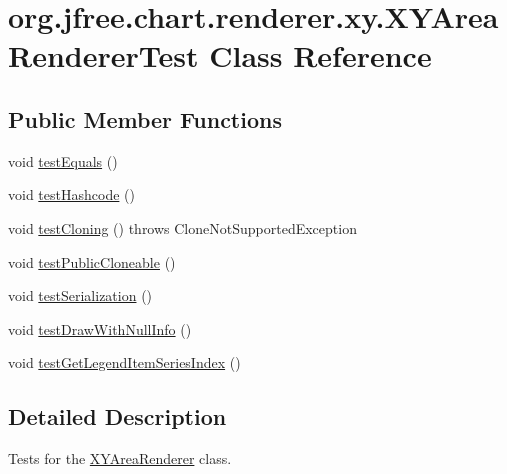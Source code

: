 \hypertarget{classorg_1_1jfree_1_1chart_1_1renderer_1_1xy_1_1_x_y_area_renderer_test}{}\section{org.\+jfree.\+chart.\+renderer.\+xy.\+X\+Y\+Area\+Renderer\+Test Class Reference}
\label{classorg_1_1jfree_1_1chart_1_1renderer_1_1xy_1_1_x_y_area_renderer_test}
\subsection*{Public Member Functions}
\begin{DoxyCompactItemize}
\item 
void \mbox{\hyperlink{classorg_1_1jfree_1_1chart_1_1renderer_1_1xy_1_1_x_y_area_renderer_test_ac270cd68baeffc1e280adbdd4898404e}{test\+Equals}} ()
\item 
void \mbox{\hyperlink{classorg_1_1jfree_1_1chart_1_1renderer_1_1xy_1_1_x_y_area_renderer_test_ae409170cd89cbb5eca27fdd1aa054289}{test\+Hashcode}} ()
\item 
void \mbox{\hyperlink{classorg_1_1jfree_1_1chart_1_1renderer_1_1xy_1_1_x_y_area_renderer_test_ab83da176f90f654ba66b118e961fae3a}{test\+Cloning}} ()  throws Clone\+Not\+Supported\+Exception 
\item 
void \mbox{\hyperlink{classorg_1_1jfree_1_1chart_1_1renderer_1_1xy_1_1_x_y_area_renderer_test_ab373cdbef91664a316bd598d1bf88da0}{test\+Public\+Cloneable}} ()
\item 
void \mbox{\hyperlink{classorg_1_1jfree_1_1chart_1_1renderer_1_1xy_1_1_x_y_area_renderer_test_a0dc4b63c7ca67d9db0edea007dfc0895}{test\+Serialization}} ()
\item 
void \mbox{\hyperlink{classorg_1_1jfree_1_1chart_1_1renderer_1_1xy_1_1_x_y_area_renderer_test_ab08a2d2deb50439de05f9a9ac8d96a63}{test\+Draw\+With\+Null\+Info}} ()
\item 
void \mbox{\hyperlink{classorg_1_1jfree_1_1chart_1_1renderer_1_1xy_1_1_x_y_area_renderer_test_a18183bb360e393015be55493905e62b0}{test\+Get\+Legend\+Item\+Series\+Index}} ()
\end{DoxyCompactItemize}


\subsection{Detailed Description}
Tests for the \mbox{\hyperlink{classorg_1_1jfree_1_1chart_1_1renderer_1_1xy_1_1_x_y_area_renderer}{X\+Y\+Area\+Renderer}} class. 

